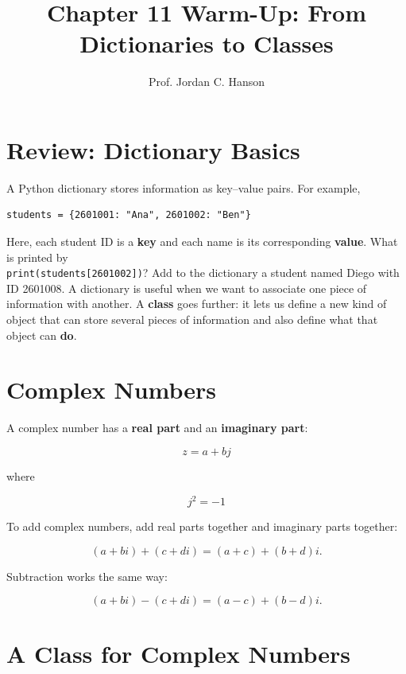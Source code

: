 \documentclass{article}
\begin{document}
\twocolumn

\title{Chapter 11 Warm-Up: From Dictionaries to Classes}
\author{Prof. Jordan C. Hanson}
\date{}

\maketitle

\section{Review: Dictionary Basics}

A Python dictionary stores information as key--value pairs. For example,

\begin{verbatim}
students = {2601001: "Ana", 2601002: "Ben"}
\end{verbatim}
\noindent
Here, each student ID is a \textbf{key} and each name is its corresponding \textbf{value}.  What is printed by  \\ \texttt{print(students[2601002])}?  Add to the dictionary a student named Diego with ID 2601008.  A dictionary is useful when we want to associate one piece of information with another. A \textbf{class} goes further: it lets us define a new kind of object that can store several pieces of information and also define what that object can \textbf{do}.

\section{Complex Numbers}

A complex number has a \textbf{real part} and an \textbf{imaginary part}:

\begin{equation}
z = a + bj
\end{equation}

where

\begin{equation}
j^2 = -1
\end{equation}

To add complex numbers, add real parts together and imaginary parts together:

\[
(a+bi)+(c+di)
=
(a+c)+(b+d)i.
\]

Subtraction works the same way:

\[
(a+bi)-(c+di)
=
(a-c)+(b-d)i.
\]

\section{A Class for Complex Numbers}
\end{document}
